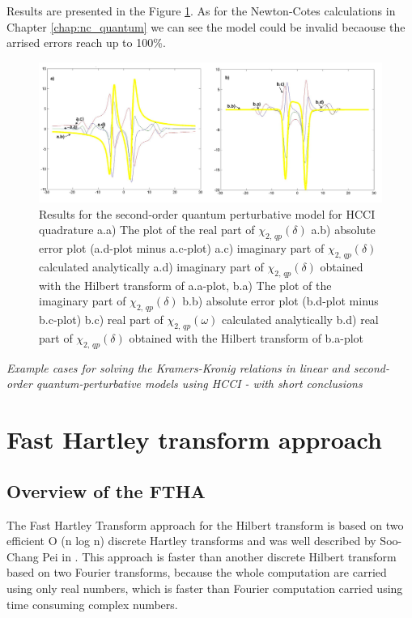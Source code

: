 \documentclass[12pt,twoside,a4paper]{article}
\numberwithin{equation}{subsection}
\numberwithin{figure}{subsection}
\begin{document}
Results are presented in the Figure \ref{fig:hcc_qp2}. As for the Newton-Cotes calculations in Chapter \ref{chap:nc_quantum} we can
see the model could be invalid becaouse the arrised errors reach up to 100\%. 

\begin{figure} 
  \includegraphics[width=150mm]{img/hcc_qp2.png}
  \caption{Results for the second-order quantum perturbative model for HCCI quadrature
     a.a) The plot of the real part of ${\chi_{2, \,qp}}(\delta )$
     a.b) absolute error plot (a.d-plot minus a.c-plot) 
     a.c) imaginary part of ${\chi_{2, \,qp}}(\delta )$ calculated analytically 
     a.d) imaginary part of ${\chi_{2, \,qp}}(\delta )$ obtained with the Hilbert transform of a.a-plot, 
     b.a) The plot of the imaginary part of ${\chi_{2, \,qp}}(\delta )$ 
     b.b) absolute error plot (b.d-plot minus b.c-plot) 
     b.c) real part of $\chi_{2, \,qp} (\omega )$ calculated analytically 
     b.d) real part of ${\chi_{2, \,qp}}(\delta )$ obtained with the Hilbert transform of b.a-plot 
     \label{fig:hcc_qp2}
     }
\end{figure}

\textit{Example cases for solving the Kramers-Kronig relations in linear and se\-cond-order quan\-tum-per\-tur\-ba\-ti\-ve models
using HCCI - with short conclusions}


\section{Fast Hartley transform approach} \label{chap:hartley}

\subsection{Overview of the FTHA} \label{chap:hartley_overview}

The Fast Hartley Transform approach for the Hilbert transform is based on two efficient O (n log n) discrete Hartley transforms and
was well described by Soo-Chang Pei in \cite{chang_computation}. This approach is faster than another discrete Hilbert transform
based on two Fourier transforms, because the whole computation are carried using only real numbers, which is faster than Fourier
computation carried using time consuming complex numbers.
\end{document}
